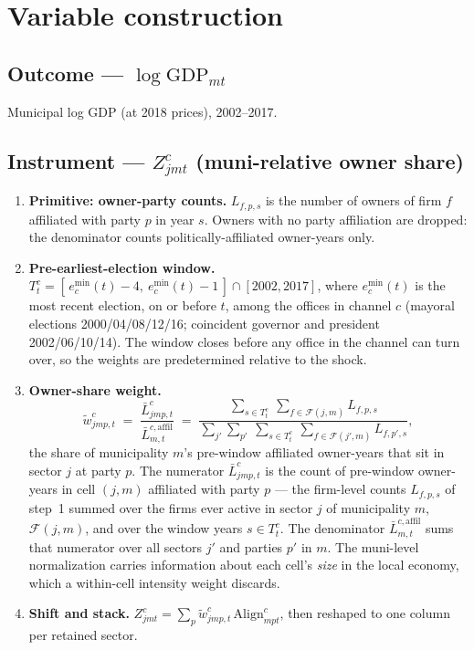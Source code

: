 \documentclass{article}
\newcommand{\Align}{\mathrm{Align}}
\newcommand{\cF}{\mathcal{F}}
\begin{document}
\section{Variable construction}\label{sec:vars}

\subsection*{Outcome --- $\log\mathrm{GDP}_{mt}$}
Municipal log GDP (at 2018 prices), 2002--2017.

\subsection*{Instrument --- $Z^{c}_{jmt}$ (muni-relative owner share)}

\begin{enumerate}[leftmargin=*,nosep]
\item \textbf{Primitive: owner-party counts.} $L_{f,p,s}$ is the number of
  owners of firm $f$ affiliated with party $p$ in year $s$. Owners with no party affiliation are
  dropped: the denominator counts politically-affiliated owner-years
  only.
\item \textbf{Pre-earliest-election window.}
  $T^{c}_{t}=[\,e^{\min}_{c}(t)-4,\ e^{\min}_{c}(t)-1\,]\cap[2002,2017]$, where
  $e^{\min}_{c}(t)$ is the most recent election, on or before $t$, among the
  offices in channel $c$ (mayoral elections 2000/04/08/12/16; coincident
  governor and president 2002/06/10/14). The window closes before any office in
  the channel can turn over, so the weights are predetermined relative to the
  shock.
\item \textbf{Owner-share weight.}
  \[
    \tilde w^{c}_{jmp,t}
    \;=\;
    \frac{\bar L^{c}_{jmp,t}}{\bar L^{c,\mathrm{affil}}_{m,t}}
    \;=\;
    \frac{\displaystyle\sum_{s\in T^{c}_{t}}\ \sum_{f\in\cF(j,m)} L_{f,p,s}}
         {\displaystyle\sum_{j'}\sum_{p'}\ \sum_{s\in T^{c}_{t}}\
          \sum_{f\in\cF(j',m)} L_{f,p',s}},
  \]
  the share of municipality $m$'s pre-window affiliated owner-years that sit in
  sector $j$ at party $p$. The numerator $\bar L^{c}_{jmp,t}$ is the count of
  pre-window owner-years in cell $(j,m)$ affiliated with party $p$ --- the
  firm-level counts $L_{f,p,s}$ of step~1 summed over the firms ever active in
  sector $j$ of municipality $m$, $\cF(j,m)$, and over the window years
  $s\in T^{c}_{t}$. The denominator $\bar L^{c,\mathrm{affil}}_{m,t}$ sums that
  numerator over all sectors $j'$ and parties $p'$ in $m$. The muni-level
  normalization carries information about each cell's \emph{size} in the local
  economy, which a within-cell intensity weight discards.
\item \textbf{Shift and stack.}
  $Z^{c}_{jmt}=\sum_{p}\tilde w^{c}_{jmp,t}\,\Align^{c}_{mpt}$, then reshaped to
  one column per retained sector.
\end{enumerate}
\end{document}
